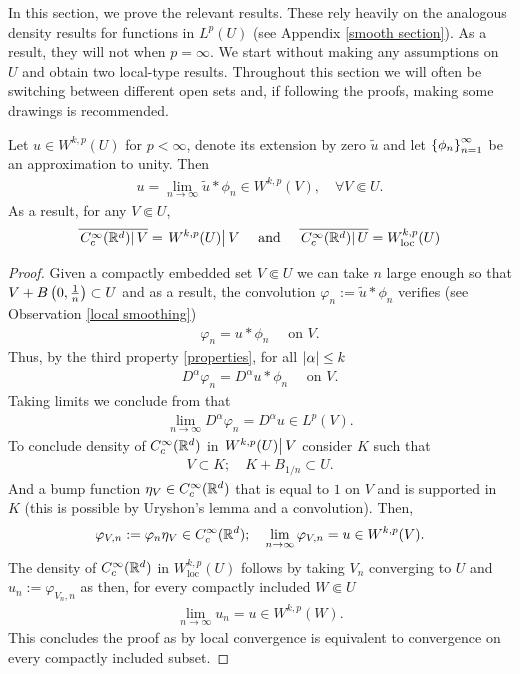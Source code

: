\documentclass[
    a4paper,
    DIV=14,
    abstract=true,
    numbers=noenddot
]{scrartcl}
\begin{document}
In this section, we prove the relevant results. These rely heavily on the analogous density results for functions in $L^p(U)$ (see Appendix \ref{smooth section}). As a result, they will not when $p=\infty$. We start without making any assumptions on $U$ and obtain two local-type results. Throughout this section we will often be switching between different open sets and, if following the proofs, making some drawings is recommended.
\begin{theorem}\label{local} Let  $u \in W^{k,p}(U)$ for $p < \infty$, denote its extension by zero $\tilde{u}$  and let $\left\{\phi_n\right\}_{n=1}^\infty $ be an approximation to unity. Then
	\begin{align*}
		u=\lim_{n \to \infty} \tilde{u}*\phi_n  \in W^{k,p}(V) , \quad\forall V \Subset U.
	\end{align*}
	As a result, for any $V \Subset U$,
	\begin{align*}
		\overline{\left.C_c^\infty(\mathbb{R}^d)\right|{V}}=\left.W^{k,p}(U)\right|{V}\quad \text{ and } \quad \overline{\left.C_c^\infty(\mathbb{R}^d)\right|{U}}=W_{\mathrm{loc}}^{k,p}(U)
	\end{align*}

\end{theorem}
\begin{proof}
	Given a compactly embedded set $V \Subset U$ we can take $n$ large enough so that  $V+  B \left(0, \frac{1}{n}\right) \subset U$ and as a result, the convolution  $\varphi_n:= \tilde{u} * \phi_n$  verifies (see Observation \ref{local smoothing})
	\begin{align*}
		\varphi_n= u* \phi_n \quad  \text{ on  } V .
	\end{align*}
	Thus, by the third property \ref{properties}, for all ${\left| \alpha \right|} \leq k $
	\begin{align*}
		D^\alpha \varphi_n = D^\alpha u * \phi_n \quad \text{ on } V.
	\end{align*}
	Taking limits we conclude from  that
	\begin{align*}
		\lim_{n \to \infty}D^\alpha \varphi_n =D^\alpha u \in L^p(V) .
	\end{align*}
	To conclude density of $C_c^\infty(\mathbb{R}^d)$ in $\left.W^{k,p}(U)\right|{V}$  consider $K$ such that
	\begin{align*}
		V \subset K; \quad  K+ B_{1 /n}\subset U.
	\end{align*}
	And a bump function $\eta_V \in C_c^\infty(\mathbb{R}^d)$ that is equal to $1$ on  $V$ and is supported in $K$ (this is possible by Uryshon's lemma and a convolution). Then,
	\begin{align*}
		\varphi_{V,n}:= \varphi_n \eta _V \in C_c^\infty(\mathbb{R}^d); \quad \lim_{n \to \infty}\varphi_{V,n}=u \in W^{k,p}(V).
	\end{align*}
	The density of $C_c^\infty(\mathbb{R}^d)$ in  $W^{k,p}_{\mathrm{loc}}(U)$ follows by taking $V_n$ converging to  $U$ and  $u_n:= \varphi_{V_n,n}$ as then, for every compactly included $W \Subset  U$
	\begin{align*}
		\lim_{n \to \infty}u_{n}=u \in W^{k,p}(W) .
	\end{align*}
	This concludes the proof as by  local convergence is equivalent to convergence on every compactly included subset.
\end{proof}
\end{document}

